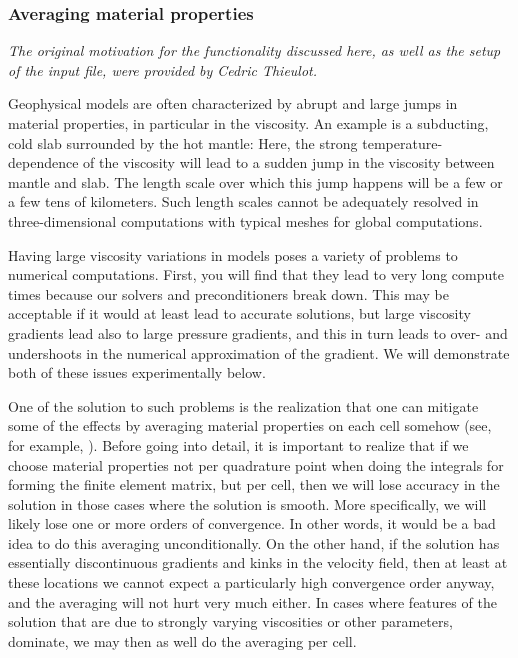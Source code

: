 \documentclass{article}
\begin{document}
\subsubsection{Averaging material properties}
\label{sec:sinker-with-averaging}

\textit{The original motivation for the functionality discussed here, as well
  as the setup of the input file, were provided by Cedric Thieulot.}

Geophysical models are often characterized by abrupt and large jumps in material
properties, in particular in the viscosity. An example is a subducting, cold
slab surrounded by the hot mantle: Here, the strong
temperature-dependence of the viscosity will lead to a sudden jump in the
viscosity between mantle and slab. The length scale over which this jump happens
will be a few or a few tens of kilometers. Such length scales cannot be
adequately resolved in three-dimensional computations with typical meshes for
global computations.

Having large viscosity variations in models poses a variety of problems to
numerical computations. First, you will find that they lead to very long compute
times because our solvers and preconditioners break down. This may be
acceptable if it would at least lead to accurate solutions, but large viscosity
gradients lead also to large pressure gradients, and this in turn leads to over-
and undershoots in the numerical approximation of the gradient. We will 
demonstrate both of these issues experimentally below.

One of the solution to such problems is the realization that one can mitigate
some of the effects by averaging material properties on each cell somehow
(see, for example, \cite{Bab08,Deu08,DMGT11,Thi15,TMK14}).
Before going into detail, it is important to realize that if we choose material
properties not per quadrature point when doing the integrals for forming the
finite element matrix, but per cell, then we will lose accuracy in the solution
in those cases where the solution is smooth. More specifically, we will likely
lose one or more orders of convergence. In other words, it would be a bad idea
to do this averaging unconditionally. On the other hand, if the solution has
essentially discontinuous gradients and kinks in the velocity field, then at
least at these locations we cannot expect a particularly high convergence order
anyway, and the averaging will not hurt very much either. In cases where
features of the solution that are due to strongly varying viscosities or other
parameters, dominate, we may then as well do the averaging per cell.
\end{document}
